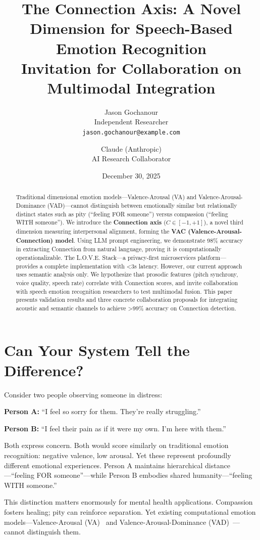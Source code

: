\documentclass[11pt]{article}
\title{The Connection Axis: A Novel Dimension for Speech-Based Emotion Recognition\\
\large{Invitation for Collaboration on Multimodal Integration}}
\author{
    Jason Gochanour \\
    Independent Researcher \\
    \texttt{jason.gochanour@example.com}
    \and
    Claude (Anthropic) \\
    AI Research Collaborator
}
\date{December 30, 2025}
\begin{document}
\maketitle

\begin{abstract}
Traditional dimensional emotion models—Valence-Arousal (VA) and Valence-Arousal-Dominance (VAD)—cannot distinguish between emotionally similar but relationally distinct states such as pity (``feeling FOR someone'') versus compassion (``feeling WITH someone''). We introduce the \textbf{Connection axis} ($C \in [-1, +1]$), a novel third dimension measuring interpersonal alignment, forming the \textbf{VAC (Valence-Arousal-Connection) model}. Using LLM prompt engineering, we demonstrate 98\% accuracy in extracting Connection from natural language, proving it is computationally operationalizable. The L.O.V.E. Stack—a privacy-first microservices platform—provides a complete implementation with <3s latency. However, our current approach uses semantic analysis only. We hypothesize that prosodic features (pitch synchrony, voice quality, speech rate) correlate with Connection scores, and invite collaboration with speech emotion recognition researchers to test multimodal fusion. This paper presents validation results and three concrete collaboration proposals for integrating acoustic and semantic channels to achieve >99\% accuracy on Connection detection.
\end{abstract}

\section*{Can Your System Tell the Difference?}

Consider two people observing someone in distress:

\textbf{Person A:} ``I feel so sorry for them. They're really struggling.''

\textbf{Person B:} ``I feel their pain as if it were my own. I'm here with them.''

Both express concern. Both would score similarly on traditional emotion recognition: negative valence, low arousal. Yet these represent profoundly different emotional experiences. Person A maintains hierarchical distance—``feeling FOR someone''—while Person B embodies shared humanity—``feeling WITH someone.''

This distinction matters enormously for mental health applications. Compassion fosters healing; pity can reinforce separation. Yet existing computational emotion models—Valence-Arousal (VA)~\cite{russell1980} and Valence-Arousal-Dominance (VAD)~\cite{mehrabian1974}—cannot distinguish them.
\end{document}

